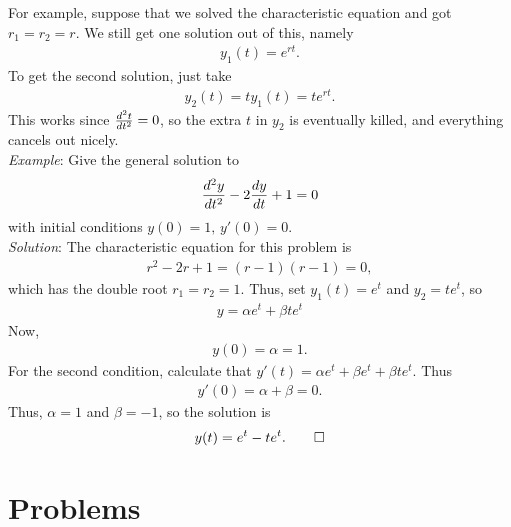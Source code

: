 \documentclass{book}
\begin{document}
For example, suppose that we solved the characteristic equation and got
$r_1=r_2=r$. We still get one solution out of this, namely
\begin{align*}
y_1(t) =e^{rt}.
\end{align*}
To get the second solution, just take
\begin{align*}
y_2(t) = t y_1(t) = t e^{rt}.
\end{align*}
This works since $\frac{d^2 t}{d t^2}=0$, so the extra $t$ in $y_2$ is eventually
killed, and everything cancels out nicely.
\\

\noindent\emph{Example}: Give the general solution to
\begin{align*}
\frac{d^2 y}{d t^2} - 2 \frac{d y}{d t}+1 =0
\end{align*}
with initial conditions $y(0) =1, \, y'(0) =0.$\\
\noindent\emph{Solution}:
The characteristic equation for this problem is
\begin{align*}
r^2 - 2r +1 = (r-1)(r-1) =0,
\end{align*}
which has the double root $r_1=r_2=1$. Thus, set
$y_1(t) = e^t$ and $y_2=t e^t$, so
\begin{align*}
y = \alpha e^t + \beta t e^t
\end{align*}
Now,
\begin{align*}
y(0) = \alpha = 1.
\end{align*}
For the second condition, calculate that
$y'(t) = \alpha e^t + \beta e^t + \beta te^t$. Thus
\begin{align*}
y'(0) = \alpha + \beta =0.
\end{align*}
Thus, $\alpha=1$ and $\beta =-1$, so the solution is
\begin{align*}
y(t) = e^t - te^t. \qed
\end{align*}


\section{Problems}
\end{document}
